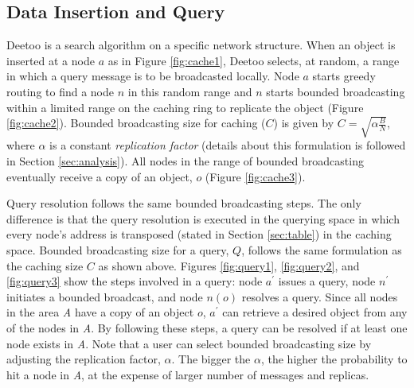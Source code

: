 \documentclass[conference]{IEEEtran}
\begin{document}
\subsection{Data Insertion and Query}\label{sec:cache}
Deetoo is a search algorithm on a specific network structure. When an object
is inserted at a node $a$ as in Figure \ref{fig:cache1}, 
Deetoo selects, at random, a range in which a query message is to be broadcasted 
locally. Node $a$ starts greedy routing to find a node 
$n$ in this random range and $n$ starts bounded broadcasting 
within a limited range on the caching ring to replicate the object
(Figure \ref{fig:cache2}). 
Bounded broadcasting size for caching ($C$) is given by
$C=\sqrt{\alpha \frac{B}{N}}$, where $\alpha$ is a constant 
\textit{replication factor} (details about this formulation is followed in Section
\ref{sec:analysis}). All nodes in the range of bounded broadcasting 
eventually receive a copy of an object, $o$ (Figure \ref{fig:cache3}).

Query resolution follows the same bounded broadcasting steps. The only
difference is that the query resolution is executed in the querying
space in which every node's address is transposed (stated  
in Section \ref{sec:table}) in
the caching space. Bounded broadcasting size for a query, $Q$,
follows the same formulation as the caching size $C$ as shown above. Figures
\ref{fig:query1}, \ref{fig:query2}, and \ref{fig:query3} show the
steps involved in a query: node $a^\prime$ issues a query, node $n^\prime$ initiates a 
bounded broadcast, and node $n(o)$ resolves a query. Since all nodes in the area
\textit{A} have a copy of an object $o$, $a^\prime$ can retrieve
a desired object from any of the nodes in \textit{A}. By following these
steps, a query can be resolved if at least one node exists in
\textit{A}. Note that a user can select bounded broadcasting size by adjusting 
the replication factor, $\alpha$. The bigger the $\alpha$, 
the higher the probability to hit a node in \textit{A}, at the expense of 
larger number of messages and replicas. 
\end{document}

